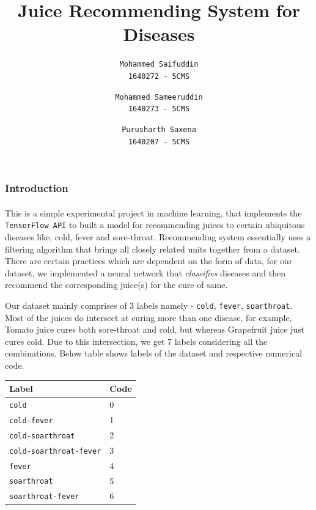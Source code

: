 \documentclass[letterpaper, 11pt]{article}
\begin{document}
\title{Juice Recommending System for Diseases}
\author{
	\texttt{Mohammed Saifuddin}\\
	\texttt{1640272 - 5CMS}
	\and
	\texttt{Mohammed Sameeruddin}\\
	\texttt{1640273 - 5CMS}
	\and
	\texttt{Purusharth Saxena}\\
	\texttt{1640207 - 5CMS}
}
\date{}
\maketitle
\subsubsection*{Introduction}
\paragraph{} This is a simple experimental project in machine learning, that implements the \texttt{TensorFlow API} to built a model for recommending juices to certain ubiquitous diseases like, cold, fever and sore-throat.
Recommending system essentially uses a filtering algorithm that brings all closely related units together from a dataset. There are certain practices which are dependent on the form of data, for our dataset, we implemented a neural network that \textit{classifies} diseases and then recommend the corresponding juice(s) for the cure of same.

Our dataset mainly comprises of 3 labels namely - \texttt{cold}, \texttt{fever}, \texttt{soarthroat}. Most of the juices do intersect at curing more than one disease, for example, Tomato juice cures both sore-throat and cold, but whereas Grapefruit juice just cures cold. Due to this intersection, we get 7 labels considering all the combinations. Below table shows labels of the dataset and respective numerical code.
\begin{center}
\setlength{\tabcolsep}{0.5em}
{\renewcommand{\arraystretch}{1}
\begin{tabular}{|p{5cm}||p{2cm}|}
\hline
\textbf{Label} & \textbf{Code}\\
\hline
\texttt{cold} & 0\\
\hline
\texttt{cold-fever} & 1\\
\hline
\texttt{cold-soarthroat} & 2\\
\hline
\texttt{cold-soarthroat-fever} & 3\\
\hline
\texttt{fever} & 4\\
\hline
\texttt{soarthroat} & 5\\
\hline
\texttt{soarthroat-fever} & 6\\
\hline
\end{tabular}
}
\end{center}
\end{document}
